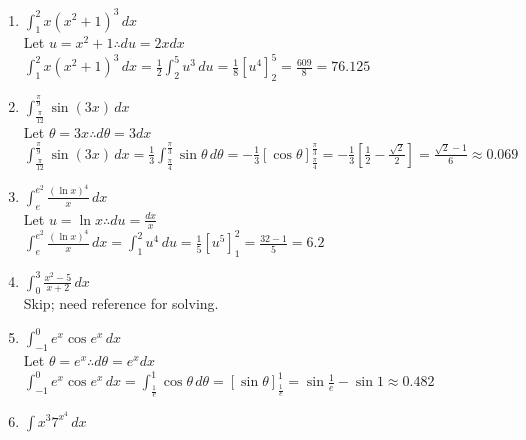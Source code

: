 \documentclass[10pt, letterpaper]{report}
\begin{document}
\begin{enumerate}
  \item{$\int_{1}^{2}{x\left(x^{2}+1\right)^{3}}\,dx$} \\

    Let $u=x^{2}+1\therefore du=2xdx$ \\

    $\int_{1}^{2}{x\left(x^{2}+1\right)^{3}}\,dx=\frac{1}{2}\int_{2}^{5}{u^{3}}\,du=
    \frac{1}{8}[u^{4}]_{2}^{5}=\frac{609}{8}=76.125$ \\

  \item{$\int_{\frac{\pi}{12}}^{\frac{\pi}{9}}{\sin{(3x)}}\,dx$} \\

    Let $\theta=3x\therefore d\theta=3dx$ \\

    $\int_{\frac{\pi}{12}}^{\frac{\pi}{9}}{\sin{(3x)}}\,dx=
    \frac{1}{3}\int_{\frac{\pi}{4}}^{\frac{\pi}{3}}{\sin{\theta}}\,d\theta=
    -\frac{1}{3}[\cos{\theta}]_{\frac{\pi}{4}}^{\frac{\pi}{3}}=
    -\frac{1}{3}[\frac{1}{2}-\frac{\sqrt{2}}{2}]=
    \frac{\sqrt{2}-1}{6}\approx0.069$ \\

  \item{$\int_{e}^{e^{2}}{\frac{(\ln{x})^{4}}{x}}\,dx$} \\

    Let $u=\ln{x}\therefore du=\frac{dx}{x}$ \\

    $\int_{e}^{e^{2}}{\frac{(\ln{x})^{4}}{x}}\,dx=\int_{1}^{2}{u^{4}}\,du=\frac{1}{5}[u^{5}]_{1}^{2}=\frac{32-1}{5}=6.2$ \\

  \item{$\int_{0}^{3}{\frac{x^{2}-5}{x+2}}\,dx$} \\

    Skip; need reference for solving. \\

  \item{$\int_{-1}^{0}{e^{x}\cos{e^{x}}}\,dx$} \\

    Let $\theta=e^{x}\therefore d\theta=e^{x}dx$ \\

    $\int_{-1}^{0}{e^{x}\cos{e^{x}}}\,dx=
    \int_{\frac{1}{e}}^{1}{\cos{\theta}}\,d\theta=
    [\sin{\theta}]_{\frac{1}{e}}^{1}=
    \sin{\frac{1}{e}}-\sin{1}\approx 0.482$ \\

  \item{$\int{x^{3}7^{x^{4}}}\,dx$} \\


\end{enumerate}
\end{document}
